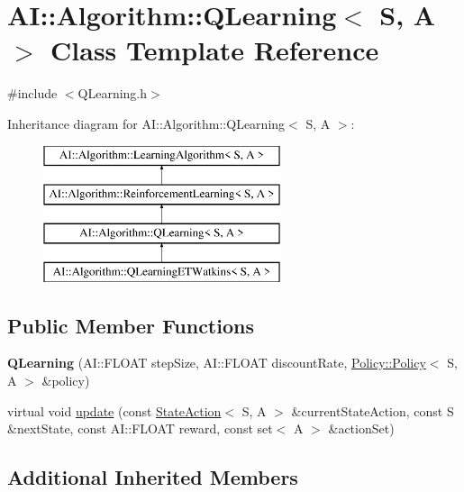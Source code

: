 \hypertarget{classAI_1_1Algorithm_1_1QLearning}{\section{A\-I\-:\-:Algorithm\-:\-:Q\-Learning$<$ S, A $>$ Class Template Reference}
\label{classAI_1_1Algorithm_1_1QLearning}
}


{\ttfamily \#include $<$Q\-Learning.\-h$>$}

Inheritance diagram for A\-I\-:\-:Algorithm\-:\-:Q\-Learning$<$ S, A $>$\-:\begin{figure}[H]
\begin{center}
\leavevmode
\includegraphics[height=4.000000cm]{classAI_1_1Algorithm_1_1QLearning}
\end{center}
\end{figure}
\subsection*{Public Member Functions}
\begin{DoxyCompactItemize}
\item 
\hypertarget{classAI_1_1Algorithm_1_1QLearning_a182fd44ac6cd6b2474615ce7b98667ce}{{\bfseries Q\-Learning} (A\-I\-::\-F\-L\-O\-A\-T step\-Size, A\-I\-::\-F\-L\-O\-A\-T discount\-Rate, \hyperlink{classAI_1_1Algorithm_1_1Policy_1_1Policy}{Policy\-::\-Policy}$<$ S, A $>$ \&policy)}\label{classAI_1_1Algorithm_1_1QLearning_a182fd44ac6cd6b2474615ce7b98667ce}

\item 
virtual void \hyperlink{classAI_1_1Algorithm_1_1QLearning_a042e1987ce21a94f59603c4cb1eeed82}{update} (const \hyperlink{classAI_1_1StateAction}{State\-Action}$<$ S, A $>$ \&current\-State\-Action, const S \&next\-State, const A\-I\-::\-F\-L\-O\-A\-T reward, const set$<$ A $>$ \&action\-Set)
\end{DoxyCompactItemize}
\subsection*{Additional Inherited Members}


